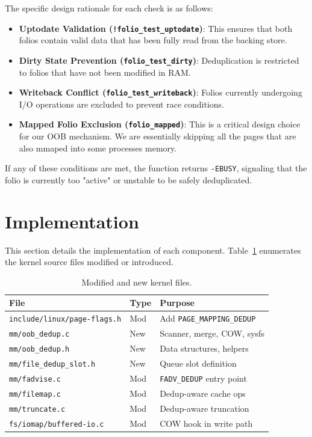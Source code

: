 \documentclass[conference]{IEEEtran}
\begin{document}
The specific design rationale for each check is as follows:

\begin{itemize}
    \item \textbf{Uptodate Validation (\texttt{!folio\_test\_uptodate})}: This ensures that both folios contain valid data that has been fully read from the backing store.
    
    \item \textbf{Dirty State Prevention (\texttt{folio\_test\_dirty})}: Deduplication is restricted to folios that have not been modified in RAM.
    
    \item \textbf{Writeback Conflict (\texttt{folio\_test\_writeback})}: Folios currently undergoing I/O operations are excluded to prevent race conditions.
    
    \item \textbf{Mapped Folio Exclusion (\texttt{folio\_mapped})}: This is a critical design choice for our OOB mechanism. We are essentially skipping all the pages that are also mmaped into some processes memory.
\end{itemize}

If any of these conditions are met, the function returns \texttt{-EBUSY}, signaling that the folio is currently too "active" or unstable to be safely deduplicated.

\section{Implementation}
\label{sec:impl}

This section details the implementation of each component. Table~\ref{tab:files} enumerates the kernel source files modified or introduced.

\begin{table}[t]
\caption{Modified and new kernel files.}
\label{tab:files}
\centering
\scriptsize
\begin{tabular}{@{}llp{3.2cm}@{}}
\toprule
\textbf{File} & \textbf{Type} & \textbf{Purpose} \\
\midrule
\texttt{include/linux/page-flags.h} & Mod & Add \texttt{PAGE\_MAPPING\_DEDUP} \\
\texttt{mm/oob\_dedup.c} & New & Scanner, merge, COW, sysfs \\
\texttt{mm/oob\_dedup.h} & New & Data structures, helpers \\
\texttt{mm/file\_dedup\_slot.h} & New & Queue slot definition \\
\texttt{mm/fadvise.c} & Mod & \texttt{FADV\_DEDUP} entry point \\
\texttt{mm/filemap.c} & Mod & Dedup-aware cache ops \\
\texttt{mm/truncate.c} & Mod & Dedup-aware truncation \\
\texttt{fs/iomap/buffered-io.c} & Mod & COW hook in write path \\
\bottomrule
\end{tabular}
\end{table}
\end{document}
